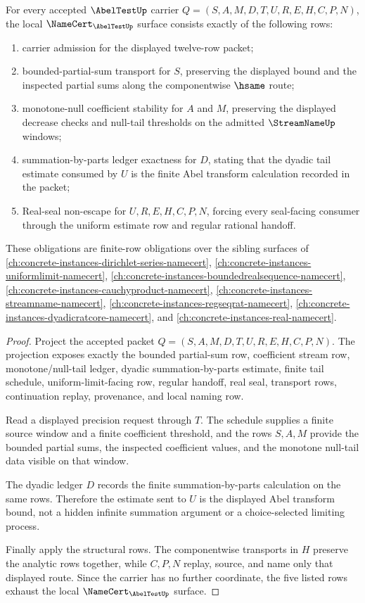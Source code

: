 \begin{theorem}
\label{thm:abel-test-namecert-obligations}
For every accepted $\AbelTestUp$ carrier $Q=(S,A,M,D,T,U,R,E,H,C,P,N)$, the local $\NameCert_{\AbelTestUp}$ surface consists exactly of the following rows:
\begin{enumerate}
\item carrier admission for the displayed twelve-row packet;
\item bounded-partial-sum transport for $S$, preserving the displayed bound and the inspected partial sums along the componentwise $\hsame$ route;
\item monotone-null coefficient stability for $A$ and $M$, preserving the displayed decrease checks and null-tail thresholds on the admitted $\StreamNameUp$ windows;
\item summation-by-parts ledger exactness for $D$, stating that the dyadic tail estimate consumed by $U$ is the finite Abel transform calculation recorded in the packet;
\item Real-seal non-escape for $U,R,E,H,C,P,N$, forcing every seal-facing consumer through the uniform estimate row and regular rational handoff.
\end{enumerate}
These obligations are finite-row obligations over the sibling surfaces of \autoref{ch:concrete-instances-dirichlet-series-namecert}, \autoref{ch:concrete-instances-uniformlimit-namecert}, \autoref{ch:concrete-instances-boundedrealsequence-namecert}, \autoref{ch:concrete-instances-cauchyproduct-namecert}, \autoref{ch:concrete-instances-streamname-namecert}, \autoref{ch:concrete-instances-regseqrat-namecert}, \autoref{ch:concrete-instances-dyadicratcore-namecert}, and \autoref{ch:concrete-instances-real-namecert}.
\end{theorem}
\begin{proof}
Project the accepted packet $Q=(S,A,M,D,T,U,R,E,H,C,P,N)$. The projection exposes exactly the bounded partial-sum row, coefficient stream row, monotone/null-tail ledger, dyadic summation-by-parts estimate, finite tail schedule, uniform-limit-facing row, regular handoff, real seal, transport rows, continuation replay, provenance, and local naming row.

Read a displayed precision request through $T$. The schedule supplies a finite source window and a finite coefficient threshold, and the rows $S,A,M$ provide the bounded partial sums, the inspected coefficient values, and the monotone null-tail data visible on that window.

The dyadic ledger $D$ records the finite summation-by-parts calculation on the same rows. Therefore the estimate sent to $U$ is the displayed Abel transform bound, not a hidden infinite summation argument or a choice-selected limiting process.

Finally apply the structural rows. The componentwise transports in $H$ preserve the analytic rows together, while $C,P,N$ replay, source, and name only that displayed route. Since the carrier has no further coordinate, the five listed rows exhaust the local $\NameCert_{\AbelTestUp}$ surface.
\end{proof}

